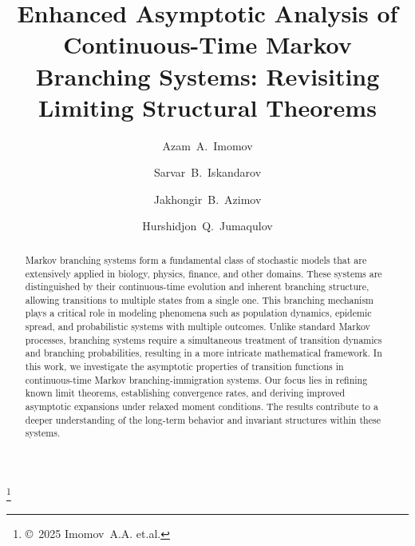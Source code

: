 \documentclass[10pt,reqno]{amsart}
\theoremstyle{definition}
\numberwithin{equation}{section}
\begin{document}
\title[Asymptotic Analysis of Markov Branching Systems]
    {Enhanced Asymptotic Analysis of Continuous-Time Markov Branching Systems: Revisiting Limiting Structural Theorems}

\author{Azam~A.~Imomov}
\address {Azam~Abdurakhimovich~Imomov
\newline\hphantom{iii} Karshi State University,
\newline\hphantom{iii} 17, Kuchabag st., 180100 Karshi city, Uzbekistan.}

\author{Sarvar~B.~Iskandarov}
\address {Sarvar~B.~Iskandarov
\newline\hphantom{iii} Urgench  State University,
\newline\hphantom{iii} Urgench  city, Uzbekistan.}

\author{Jakhongir~B.~Azimov}
\address {Jakhongir~B.~Azimov
\newline\hphantom{iii} Tashkent State Transport University,
\newline\hphantom{iii} Tashkent 100000, Uzbekistan.}

\author{Hurshidjon~Q.~Jumaqulov}
\address {Jakhongir~B.~Azimov
\newline\hphantom{iii} Kokand State University, 
\newline\hphantom{iii} Kokand, Uzbekistan.}

\thanks{\copyright \ 2025 Imomov~A.A. et.al.}




\begin{abstract}
    Markov branching systems form a fundamental class of stochastic models that are extensively applied in biology, physics,
    finance, and other domains. These systems are distinguished by their continuous-time evolution and inherent branching
    structure, allowing transitions to multiple states from a single one. This branching mechanism plays a critical role
    in modeling phenomena such as population dynamics, epidemic spread, and probabilistic systems with multiple outcomes.
    Unlike standard Markov processes, branching systems require a simultaneous treatment of transition dynamics and branching
    probabilities, resulting in a more intricate mathematical framework. In this work, we investigate the asymptotic properties
    of transition functions in continuous-time Markov branching-immigration systems. Our focus lies in refining known limit
    theorems, establishing convergence rates, and deriving improved asymptotic expansions under relaxed moment conditions.
    The results contribute to a deeper understanding of the long-term behavior and invariant structures within these systems.
\end{abstract}
\end{document}
